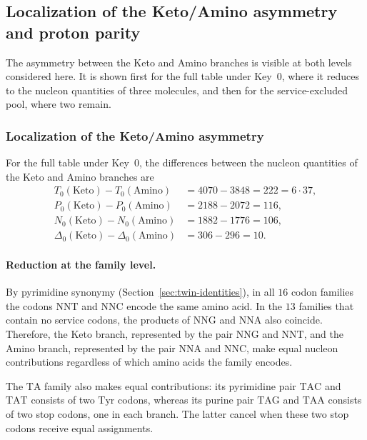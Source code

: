 \documentclass[11pt,a4paper]{article}
\renewcommand{\_}{\origunderscore\allowbreak}
\begin{document}
\subsection{Localization of the Keto/Amino asymmetry and proton parity}
\label{sec:results-localization}

The asymmetry between the Keto and Amino branches is visible at both
levels considered here. It is shown first for the full table under
Key~0, where it reduces to the nucleon quantities of three molecules,
and then for the service-excluded pool, where two remain.

\subsubsection{Localization of the Keto/Amino asymmetry}
\label{sec:results-key1-trpile}

For the full table under Key~0, the differences between the nucleon
quantities of the Keto and Amino branches are
\[
\begin{aligned}
T_{0}(\mathrm{Keto}) - T_{0}(\mathrm{Amino})
  &= 4070 - 3848 = 222 = 6 \cdot 37, \\
P_{0}(\mathrm{Keto}) - P_{0}(\mathrm{Amino})
  &= 2188 - 2072 = 116, \\
N_{0}(\mathrm{Keto}) - N_{0}(\mathrm{Amino})
  &= 1882 - 1776 = 106, \\
\Delta_{0}(\mathrm{Keto}) - \Delta_{0}(\mathrm{Amino})
  &= 306 - 296 = 10.
\end{aligned}
\]

\paragraph{Reduction at the family level.}
By pyrimidine synonymy (Section~\ref{sec:twin-identities}), in all
$16$ codon families the codons $\mathrm{NNT}$ and $\mathrm{NNC}$
encode the same amino acid. In the $13$ families that contain no
service codons, the products of $\mathrm{NNG}$ and $\mathrm{NNA}$
also coincide. Therefore, the Keto branch, represented by the pair
$\mathrm{NNG}$ and $\mathrm{NNT}$, and the Amino branch, represented
by the pair $\mathrm{NNA}$ and $\mathrm{NNC}$, make equal nucleon
contributions regardless of which amino acids the family encodes.

The $\mathrm{TA}$ family also makes equal contributions: its
pyrimidine pair $\mathrm{TAC}$ and $\mathrm{TAT}$ consists of two
$\mathrm{Tyr}$ codons, whereas its purine pair $\mathrm{TAG}$ and
$\mathrm{TAA}$ consists of two stop codons, one in each branch. The latter cancel when these two stop codons receive
equal assignments.
\end{document}
